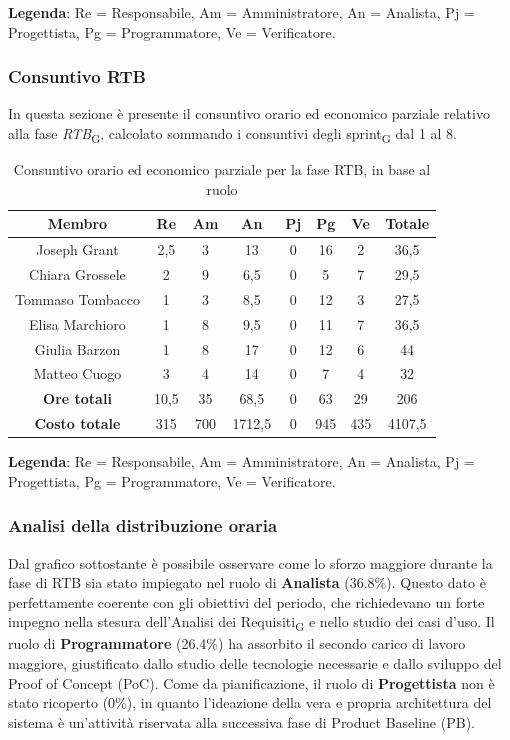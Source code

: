 \documentclass[11pt,a4paper]{article}
\newcommand{\gls}[1]{#1\textsubscript{G}}
\begin{document}
\textbf{Legenda}: Re = Responsabile, Am = Amministratore, An = Analista, Pj = Progettista, Pg = Programmatore, Ve = Verificatore.

\subsubsection{Consuntivo RTB}
In questa sezione è presente il consuntivo orario ed economico parziale relativo alla fase \textit{RTB}\textsubscript{G}, calcolato sommando i consuntivi degli \gls{sprint} dal 1 al 8.

\begin{table}[H]
    \centering
    \begin{tabular}{|c|c|c|c|c|c|c|c|}
        \hline
        \textbf{Membro} & \textbf{Re} & \textbf{Am} & \textbf{An} & \textbf{Pj} & \textbf{Pg} & \textbf{Ve} & \textbf{Totale} \\
        \hline
        Joseph Grant & 2,5 & 3 & 13 & 0 & 16 & 2 & 36,5 \\
        Chiara Grossele & 2 & 9 & 6,5 & 0 & 5 & 7 & 29,5 \\
        Tommaso Tombacco & 1 & 3 & 8,5 & 0 & 12 & 3 & 27,5 \\
        Elisa Marchioro & 1 & 8 & 9,5 & 0 & 11 & 7 & 36,5 \\
        Giulia Barzon & 1 & 8 & 17 & 0 & 12 & 6 & 44 \\
        Matteo Cuogo & 3 & 4 & 14 & 0 & 7 & 4 & 32 \\
        \hline
        \textbf{Ore totali} & 10,5 & 35 & 68,5 & 0 & 63 & 29 & 206 \\
        \hline
        \textbf{Costo totale} & 315 & 700 & 1712,5 & 0 & 945 & 435 & 4107,5 \\
        \hline
    \end{tabular}
    \caption{Consuntivo orario ed economico parziale per la fase RTB, in base al ruolo}
\end{table}

\textbf{Legenda}: Re = Responsabile, Am = Amministratore, An = Analista, Pj = Progettista, Pg = Programmatore, Ve = Verificatore.


\subsubsection{Analisi della distribuzione oraria}
Dal grafico sottostante è possibile osservare come lo sforzo maggiore durante la fase di RTB sia stato impiegato nel ruolo di \textbf{Analista} (36.8\%). Questo dato è perfettamente coerente con gli obiettivi del periodo, che richiedevano un forte impegno nella stesura dell'\gls{Analisi dei Requisiti} e nello studio dei casi d'uso. 
Il ruolo di \textbf{Programmatore} (26.4\%) ha assorbito il secondo carico di lavoro maggiore, giustificato dallo studio delle tecnologie necessarie e dallo sviluppo del Proof of Concept (PoC).
Come da pianificazione, il ruolo di \textbf{Progettista} non è stato ricoperto (0\%), in quanto l'ideazione della vera e propria architettura del sistema è un'attività riservata alla successiva fase di Product Baseline (PB).
\end{document}
